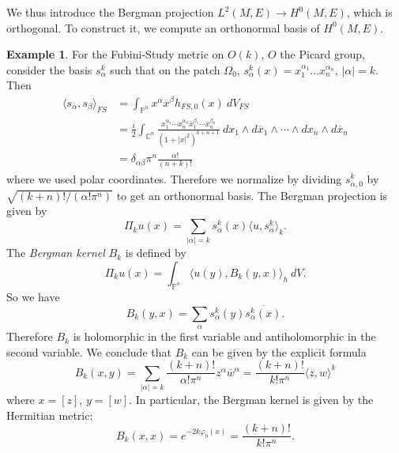 \documentclass[12pt]{report}
\newcommand{\CC}{\mathbb{C}}
\newcommand{\PP}{\mathbb{P}}
\newcommand{\dfn}[1]{\emph{#1}\index{#1}}
\theoremstyle{definition}
\newtheorem{example}[theorem]{Example}
\begin{document}
We thus introduce the Bergman projection $L^2(M, E) \to H^0(M, E)$, which is orthogonal. To construct it, we compute an orthonormal basis of $H^0(M, E)$.
\begin{example}
    For the Fubini-Study metric on $O(k)$, $O$ the Picard group, consider the basis $s_\alpha^k$ such that on the patch $\Omega_0$, $s_\alpha^k(x) = x_1^{\alpha_1}\dots x_n^{\alpha_n}$, $|\alpha| = k$. Then
\begin{align*}
    \langle s_\alpha, s_\beta\rangle_{FS} &= \int_{\PP^n} x^\alpha \overline x^\beta h_{FS,0}(x) ~dV_{FS} \\&= \frac{i}{2} \int_{\CC^n} \frac{x_1^{\alpha_1} \cdots x_n^{\alpha_n} \overline x_1^{\beta_1} \cdots \overline x_n^{\beta_n}}{(1+|x|^2)^{k+n+1}} ~dx_1\wedge d\overline x_1\wedge \cdots \wedge dx_n \wedge d\overline x_n\\
    &= \delta_{\alpha\beta} \pi^n \frac{\alpha!}{(n+k)!}
\end{align*}
    where we used polar coordinates. Therefore we normalize by dividing $s^k_{\alpha,0}$ by $\sqrt{(k+n)!/(\alpha!\pi^n)}$ to get an orthonormal basis. The Bergman projection is given by
    $$\Pi_ku(x) = \sum_{|\alpha| = k} s_\alpha^k(x) \langle u, s_\alpha^k\rangle_k.$$
    The \dfn{Bergman kernel} $B_k$ is defined by
    $$\Pi_ku(x) = \int_{\PP^n} \langle u(y), B_k(y, x)\rangle_h ~dV.$$
    So we have
    $$B_k(y, x) = \sum_\alpha s_\alpha^k(y) \overline{s_\alpha^k(x)}.$$
    Therefore $B_k$ is holomorphic in the first variable and antiholomorphic in the second variable. We conclude that $B_k$ can be given by the explicit formula
    $$B_k(x, y) = \sum_{|\alpha| = k } \frac{(k+n)!}{\alpha!\pi^n} z^\alpha \overline w^\alpha = \frac{(k+n)!}{k!\pi^n} \langle z, w\rangle^k$$
    where $x = [z]$, $y = [w]$. In particular, the Bergman kernel is given by the Hermitian metric:
    $$B_k(x, x) = e^{-2k\varphi_0(x)} = \frac{(k+n)!}{k!\pi^n}.$$
\end{example}
\end{document}
